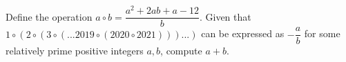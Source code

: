 Define the operation $a \circ b =\dfrac{a^2 + 2ab + a - 12}{b}$. Given that $1 \circ  (2 \circ  (3 \circ  (... 2019 \circ  (2020 \circ  2021)))...)$ can be expressed as $-\dfrac{a}{b}$ for some relatively prime positive integers $a,b$, compute $a + b$.
